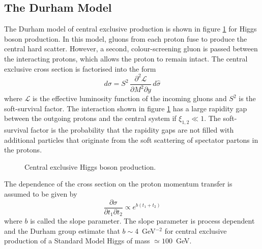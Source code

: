 \subsection{The Durham Model}

The Durham model of central exclusive production \cite{Khoze:2001xm, Khoze:1997dr, Khoze:2000cy} is shown in figure \ref{centralexclusive} for Higgs boson production. In this model, gluons from each proton fuse to produce the central hard scatter. However, a second, colour-screening gluon is passed between the interacting protons, which allows the proton to remain intact. The central exclusive cross section is factorised into the form
\begin{equation}
d\sigma = S^2 \,  \frac{\partial^2 \mathcal{L}}{\partial M^2 \partial y} \, d\hat{\sigma}
\end{equation}
where $\mathcal{L}$ is the effective luminosity function of the incoming gluons and $S^2$ is the soft-survival factor. The interaction shown in figure \ref{centralexclusive} has a large rapidity gap between the outgoing protons and the central system if $\xi_{1,2} \ll 1$. The soft-survival factor is the probability that the rapidity gaps are not filled with additional particles that originate from the soft scattering of spectator partons in the protons.

\begin{figure} 
\centering
	\quad
\caption{Central exclusive Higgs boson production. \label{centralexclusive}}
\end{figure}

The dependence of the cross section on the proton momentum transfer is assumed to be given by 
\begin{equation} \label{tdep}
\frac{\partial \sigma}{\partial t_1 \partial t_2} \propto e^{b\left(t_1 + t_2 \right)}
\end{equation}
where $b$ is called the slope parameter. The slope parameter is process dependent and the Durham group estimate that $b\sim$4~GeV$^{-2}$ for central exclusive production of a Standard Model Higgs of mass $\simeq100$~GeV.

